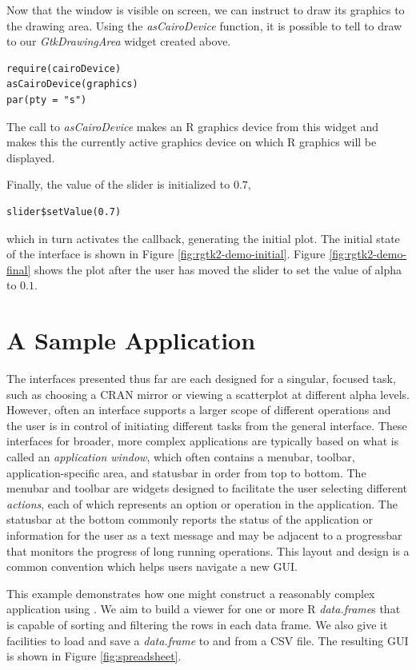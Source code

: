 \documentclass[article]{jss}
\begin{document}
Now that the window is visible on screen, we can instruct  to draw
its graphics to the drawing area. Using the \emph{asCairoDevice} function, it is possible
to tell  to draw to our \emph{GtkDrawingArea} widget created above.
\begin{verbatim}
require(cairoDevice)
asCairoDevice(graphics)
par(pty = "s")
\end{verbatim}
The call to \emph{asCairoDevice} makes an R graphics device from this
widget and makes this the currently active graphics device on which R
graphics will be displayed.

Finally, the value of the slider is initialized to $0.7$,
\begin{verbatim}
slider$setValue(0.7)
\end{verbatim}
which in turn activates the callback, generating the initial plot. The
initial state of the interface is shown in Figure
\ref{fig:rgtk2-demo-initial}.  Figure \ref{fig:rgtk2-demo-final} shows
the plot after the user has moved the slider to set the value of alpha to $0.1$.


\section{A Sample Application}\label{sec:spreadsheet-example}

The interfaces presented thus far are each designed for a singular,
focused task, such as choosing a CRAN mirror or viewing a scatterplot
at different alpha levels.  However, often an interface supports a
larger scope of different operations and the user is in control of
initiating different tasks from the general interface. These interfaces for broader, more complex
applications are typically based on what is called an
\emph{application window}, which often contains a menubar, toolbar,
application-specific area, and statusbar in order from top to
bottom. The menubar and toolbar are widgets designed to facilitate the
user selecting different \emph{actions}, each of which represents an
option or operation in the application.  The statusbar at the bottom
commonly reports the status of the application or information for the
user as a text message and may be adjacent to a progressbar that
monitors the progress of long running operations.  This layout and
design is a common convention which helps users navigate a new GUI.


This example demonstrates how one might construct a reasonably complex
application using . We aim to build a viewer for one or
more R \emph{data.frame}s that is capable of sorting and filtering the
rows in each data frame. We also give it facilities to load and save a
\emph{data.frame} to and from a CSV file. The resulting GUI is shown
in Figure \ref{fig:spreadsheet}.
\end{document}
